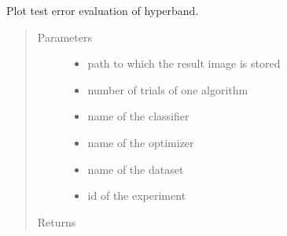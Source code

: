 \documentclass[letterpaper,10pt,english]{sphinxmanual}
\begin{document}
\begin{fulllineitems}
\label{\detokenize{index:plots.plot_hyperband_only}}
Plot test error evaluation of hyperband.
\begin{quote}\begin{description}
\item[{Parameters}] \leavevmode\begin{itemize}
\item {} 
 \textendash{} path to which the result image is stored

\item {} 
 \textendash{} number of trials of one algorithm

\item {} 
 \textendash{} name of the classifier

\item {} 
 \textendash{} name of the optimizer

\item {} 
 \textendash{} name of the dataset

\item {} 
 \textendash{} id of the experiment

\end{itemize}

\item[{Returns}] \leavevmode


\end{description}\end{quote}

\end{fulllineitems}

\end{document}
